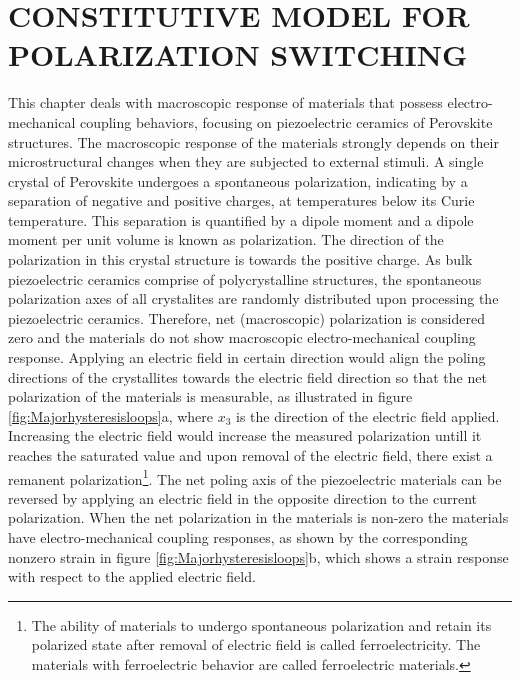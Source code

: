 %
%
%


\chapter{  \uppercase {constitutive model for polarization switching}  } 
\label{section:chap_02_constitutive_model_for_polarization_switching}

This chapter deals with macroscopic response of materials that possess electro-mechanical coupling behaviors,
 focusing on piezoelectric ceramics of Perovskite structures. 
The macroscopic response of the materials strongly depends on their
microstructural changes when they are subjected to external stimuli.
A single crystal of Perovskite undergoes a spontaneous polarization, indicating
by a separation of negative and positive charges, at temperatures below its Curie temperature. 
This separation is quantified by a dipole moment and a dipole moment per unit volume is known as polarization. 
The direction of the polarization in this crystal structure is towards the positive charge. 
As bulk piezoelectric ceramics comprise of polycrystalline structures,
 the spontaneous polarization axes of all crystalites are
 randomly distributed upon processing the piezoelectric ceramics. 
Therefore, net (macroscopic) polarization is considered zero and the materials do not show macroscopic electro-mechanical coupling response. 
Applying an electric field in certain direction would align the poling directions of the crystallites towards the electric field direction so that the net polarization of the materials is measurable,
 as illustrated in figure \ref{fig:Majorhysteresisloops}a, where $x_3$ is the direction of the electric field applied. 
Increasing the electric field would increase the measured polarization untill it
reaches the saturated value and upon removal of the electric field, there exist a remanent polarization\footnote{The ability of materials to undergo spontaneous polarization and retain its polarized state after removal of electric field is called ferroelectricity.
 The materials with ferroelectric behavior are called ferroelectric materials.}. 
The net poling axis of the piezoelectric materials can be reversed by applying an electric field in the opposite direction to the current polarization. 
When the net polarization in the materials is non-zero the materials have electro-mechanical coupling responses,
 as shown by the corresponding nonzero strain in figure \ref{fig:Majorhysteresisloops}b, which shows a strain response with respect to the applied electric field.


